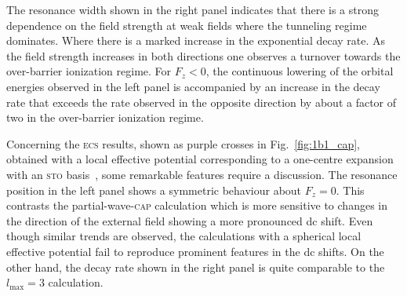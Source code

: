 The resonance width shown in the right panel indicates that there is a
strong dependence on the field strength at weak fields where the
tunneling regime dominates. Where there is a marked increase in the
exponential decay rate. As the field strength increases in both
directions one observes a turnover towards the over-barrier ionization
regime. For $F_{z} < 0$, the continuous lowering of the orbital
energies observed in the left panel is accompanied by an increase in
the decay rate that exceeds the rate observed in the opposite
direction by about a factor of two in the over-barrier ionization
regime.



Concerning the \textsc{ecs} results, shown as purple crosses in
Fig.~\ref{fig:1b1_cap}, obtained with a local effective potential
corresponding to a one-centre expansion with an \textsc{sto}
basis~\cite{sarias_2016}, some remarkable features require a
discussion. The resonance position in the left panel shows a symmetric
behaviour about $F_{z} = 0$. This contrasts the
partial-wave-\textsc{cap} calculation which is more sensitive to
changes in the direction of the external field showing a more
pronounced dc shift. Even though similar trends are observed, the
calculations with a spherical local effective potential fail to
reproduce prominent features in the dc shifts. On the other hand, the
decay rate shown in the right panel is quite comparable to the
$l_{\mathrm{max}} = 3$ calculation.

